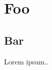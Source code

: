 \documentclass{book}
\begin{document}
    \pagestyle{empty}
    \makefrontpage%
    \makefrontpagealt
    \pagestyle{headings}
    \tableofcontents
    \chapter{Foo}
    \section{Bar}
    Lorem ipsum..
\end{document}

